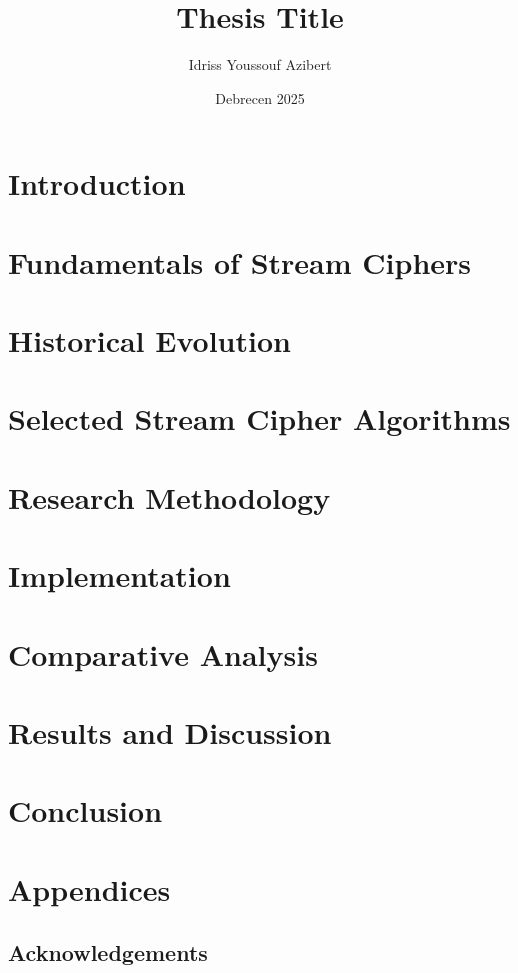 \documentclass[12pt]{report}
\title{Thesis Title}
\author{Idriss Youssouf Azibert}
\date{Debrecen 2025}
\begin{document}
\maketitle

\begin{abstract}
\end{abstract}

\tableofcontents
\listoffigures
\listoftables
\listofalgorithms

\chapter{Introduction}

\chapter{Fundamentals of Stream Ciphers}

\chapter{Historical Evolution}

\chapter{Selected Stream Cipher Algorithms}

\chapter{Research Methodology}

\chapter{Implementation}

\chapter{Comparative Analysis}

\chapter{Results and Discussion}

\chapter{Conclusion}




\appendix
\chapter{Appendices}

\section*{Acknowledgements}
\end{document}
